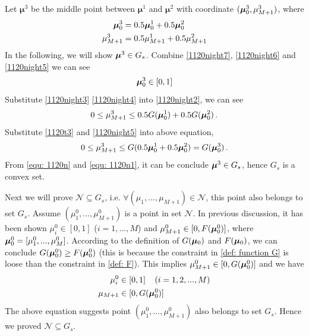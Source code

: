 Let $\boldsymbol{\mu}^3$ be the middle point between $\boldsymbol{\mu}^1$ and $\boldsymbol{\mu}^2$ with coordinate $(\boldsymbol{\mu}_0^3, \mu_{M+1}^3)$, where  
\begin{subequations}
\label{1120t5}
\begin{align}
\label{1120night5}
\boldsymbol{\mu}_0^3 &= 0.5\boldsymbol{\mu}_0^1 + 0.5 \boldsymbol{\mu}_0^2\\
\label{1120night2}
\mu_{M+1}^3 &= 0.5 \mu_{M+1}^1 + 0.5 \mu_{M+1}^2
\end{align}
\end{subequations}
In the following, we will show $\boldsymbol{\mu}^3 \in G_s$.  
Combine  \eqref{1120night7}, \eqref{1120night6} and \eqref{1120night5} we can see
\begin{equation}
\label{equ: 1120n1}
\boldsymbol{\mu}_0^3 \in [0, 1]
\end{equation}
Substitute \eqref{1120night3} \eqref{1120night4} into \eqref{1120night2}, we can see
\begin{equation}
0 \leq \mu_{M+1}^3 \leq 0.5 G( \boldsymbol{\mu}_0^1) + 0.5G(\boldsymbol{\mu}_0^2)\,.
\end{equation}
Substitute \eqref{1120t3} and \eqref{1120night5} into above equation,
\begin{equation}
\label{equ: 1120n}
0 \leq \mu_{M+1}^3 \leq G(0.5 \boldsymbol{\mu}_0^1 + 0.5\boldsymbol{\mu}_0^2) = G(\boldsymbol{\mu}_0^3)\,.
\end{equation}
From \eqref{equ: 1120n} and \eqref{equ: 1120n1}, it can be conclude 
 $\boldsymbol{\mu}^3 \in G_s$, hence $G_s$  is a convex set.  

Next we will prove $\mathcal{N} \subseteq G_s$, i.e. $\forall (\mu_1, ..., \mu_{M+1}) \in \mathcal{N}$, this point also belongs to set $G_s$.
Assume $(\mu_1^0, ..., \mu_{M+1}^0)$ is a point in set $\mathcal{N}$. 
In previous discussion, it has been shown $\mu_i^0 \in [0, 1]$ ($i = 1, ..., M$) and $\mu_{M+1}^0 \in [0, F(\boldsymbol{\mu}_0^0)]$, where $\boldsymbol{\mu}_0^0 = [\mu_1^0, ..., \mu_M^0]$. 
According to the definition of $G(\boldsymbol{\mu}_0)$ and $F(\boldsymbol{\mu}_0)$, we can conclude $G(\boldsymbol{\mu}_0^0) \geq F(\boldsymbol{\mu}_0^0)$ (this is because the constraint in \eqref{def: function G} is loose than the constraint in \eqref{def: F}). 
This implies $\mu_{M+1}^0 \in [0, G(\boldsymbol{\mu}_0^0)]$ and we have  
\begin{equation}
\begin{split}
\mu_i^0 &\in [0, 1]\;\;\;\;(i=1, 2, ..., M)\\
\mu_{M+1} &\in [0, G(\boldsymbol{\mu}_0^0)]
\end{split}
\end{equation}
The above equation suggests point $(\mu_1^0, ..., \mu_{M+1}^0)$ also belongs to set $G_s$.
Hence we proved $\mathcal{N} \subseteq G_s$. 

